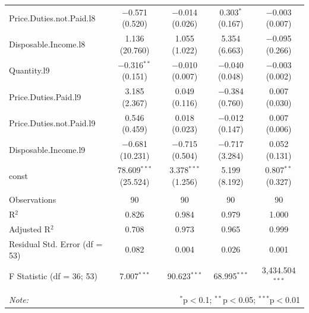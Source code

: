 \documentclass[11pt,preprint, authoryear]{elsarticle}
\let\origtable\table
\let\endorigtable\endtable
\renewenvironment{table}[1][2] {
    \expandafter\origtable\expandafter[H]
} {
    \endorigtable
}
\numberwithin{equation}{section}
\numberwithin{figure}{section}
\numberwithin{table}{section}
\begin{document}
\begin{table}[!htbp]
\begin{tabular}{@{\extracolsep{1pt}}lcccc}
  Price.Duties.not.Paid.l8 & $-$0.571 (0.520) & $-$0.014 (0.026) & 0.303$^{*}$ (0.167) & $-$0.003 (0.007) \\ 
  Disposable.Income.l8 & 1.136 (20.760) & 1.055 (1.022) & 5.354 (6.663) & $-$0.095 (0.266) \\ 
  Quantity.l9 & $-$0.316$^{**}$ (0.151) & $-$0.010 (0.007) & $-$0.040 (0.048) & $-$0.003 (0.002) \\ 
  Price.Duties.Paid.l9 & 3.185 (2.367) & 0.049 (0.116) & $-$0.384 (0.760) & 0.007 (0.030) \\ 
  Price.Duties.not.Paid.l9 & 0.546 (0.459) & 0.018 (0.023) & $-$0.012 (0.147) & 0.007 (0.006) \\ 
  Disposable.Income.l9 & $-$0.681 (10.231) & $-$0.715 (0.504) & $-$0.717 (3.284) & 0.052 (0.131) \\ 
  const & 78.609$^{***}$ (25.524) & 3.378$^{***}$ (1.256) & 5.199 (8.192) & 0.807$^{**}$ (0.327) \\ 
 \hline \\[-1.8ex] 
Observations & 90 & 90 & 90 & 90 \\ 
R$^{2}$ & 0.826 & 0.984 & 0.979 & 1.000 \\ 
Adjusted R$^{2}$ & 0.708 & 0.973 & 0.965 & 0.999 \\ 
Residual Std. Error (df = 53) & 0.082 & 0.004 & 0.026 & 0.001 \\ 
F Statistic (df = 36; 53) & 7.007$^{***}$ & 90.623$^{***}$ & 68.995$^{***}$ & 3,434.504$^{***}$ \\ 
\hline 
\hline \\[-1.8ex] 
\textit{Note:}  & \multicolumn{4}{r}{$^{*}$p$<$0.1; $^{**}$p$<$0.05; $^{***}$p$<$0.01} \\ 
\end{tabular} 
\end{table}
\end{document}
